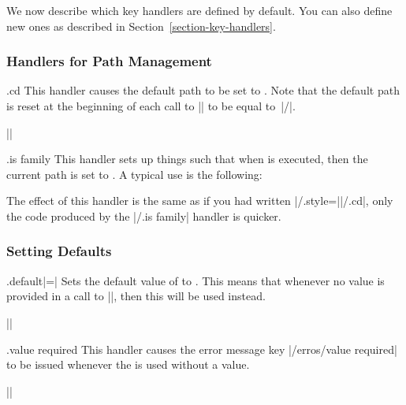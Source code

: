 We now describe which key handlers are defined by default. You can
also define new ones as described in Section~\ref{section-key-handlers}.


\subsubsection{Handlers for Path Management}

\begin{handler}{{.cd}}
  This handler causes the default path to be set to . Note that
  the default path is reset at the beginning of each call to
  |\pgfkeys| to be equal to~|/|.

  \example ||
\end{handler}

\begin{handler}{{.is family}}
\label{section-is family-handler}
  This handler sets up things such that when  is executed, then
  the current path is set to . A typical use is the following:
\begin{codeexample}
\end{codeexample}
  The effect of this handler is the same as if you had written
  |/.style=||/.cd|, only the code produced by the
  |/.is family| handler is quicker.
\end{handler}



\subsubsection{Setting Defaults}
\label{section-default-handlers}

\begin{handler}{{.default}|=|}
  Sets the default value of  to . This means
  that whenever no value is provided in a call to |\pgfkeys|, then
  this  will be used instead.

  \example ||
\end{handler}

\begin{handler}{{.value required}}
  This handler causes the error message key |/erros/value required| to
  be issued whenever the  is used without a value.

  \example ||
\end{handler}


